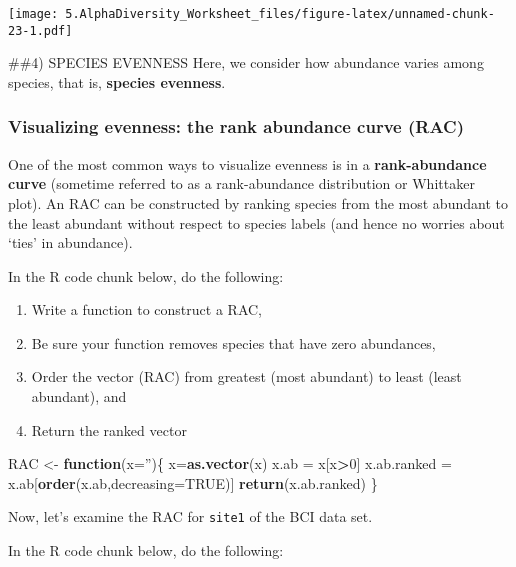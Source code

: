 \documentclass[
]{article}
\newenvironment{Shaded}{\begin{snugshade}}{\end{snugshade}}
\newcommand{\ControlFlowTok}[1]{\textcolor[rgb]{0.13,0.29,0.53}{\textbf{#1}}}
\newcommand{\DataTypeTok}[1]{\textcolor[rgb]{0.13,0.29,0.53}{#1}}
\newcommand{\DecValTok}[1]{\textcolor[rgb]{0.00,0.00,0.81}{#1}}
\newcommand{\KeywordTok}[1]{\textcolor[rgb]{0.13,0.29,0.53}{\textbf{#1}}}
\newcommand{\NormalTok}[1]{#1}
\newcommand{\OperatorTok}[1]{\textcolor[rgb]{0.81,0.36,0.00}{\textbf{#1}}}
\newcommand{\OtherTok}[1]{\textcolor[rgb]{0.56,0.35,0.01}{#1}}
\newcommand{\StringTok}[1]{\textcolor[rgb]{0.31,0.60,0.02}{#1}}
\providecommand{\tightlist}{%
  \setlength{\itemsep}{0pt}\setlength{\parskip}{0pt}}
\begin{document}
\texttt{[image: 5.AlphaDiversity\_Worksheet\_files/figure-latex/unnamed-chunk-23-1.pdf]}

\#\#4) SPECIES EVENNESS Here, we consider how abundance varies among
species, that is, \textbf{species evenness}.

\hypertarget{visualizing-evenness-the-rank-abundance-curve-rac}{%
\subsubsection{Visualizing evenness: the rank abundance curve
(RAC)}\label{visualizing-evenness-the-rank-abundance-curve-rac}}

One of the most common ways to visualize evenness is in a
\textbf{rank-abundance curve} (sometime referred to as a rank-abundance
distribution or Whittaker plot). An RAC can be constructed by ranking
species from the most abundant to the least abundant without respect to
species labels (and hence no worries about `ties' in abundance).

In the R code chunk below, do the following:

\begin{enumerate}
\def\labelenumi{\arabic{enumi}.}
\tightlist
\item
  Write a function to construct a RAC,
\item
  Be sure your function removes species that have zero abundances,
\item
  Order the vector (RAC) from greatest (most abundant) to least (least
  abundant), and
\item
  Return the ranked vector
\end{enumerate}

\begin{Shaded}
\begin{Highlighting}[]
\NormalTok{RAC <-}\StringTok{ }\ControlFlowTok{function}\NormalTok{(}\DataTypeTok{x=}\StringTok{''}\NormalTok{)\{}
\NormalTok{  x=}\KeywordTok{as.vector}\NormalTok{(x)}
\NormalTok{  x.ab =}\StringTok{ }\NormalTok{x[x}\OperatorTok{>}\DecValTok{0}\NormalTok{]}
\NormalTok{  x.ab.ranked =}\StringTok{ }\NormalTok{x.ab[}\KeywordTok{order}\NormalTok{(x.ab,}\DataTypeTok{decreasing=}\OtherTok{TRUE}\NormalTok{)]}
  \KeywordTok{return}\NormalTok{(x.ab.ranked)}
\NormalTok{\}}
\end{Highlighting}
\end{Shaded}

Now, let's examine the RAC for \texttt{site1} of the BCI data set.

In the R code chunk below, do the following:
\end{document}
